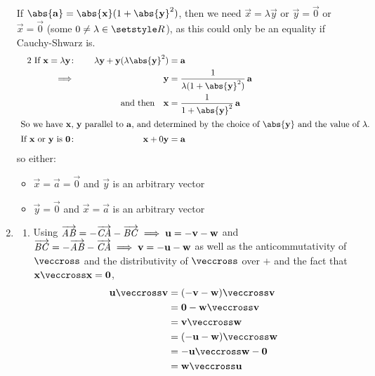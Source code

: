 \documentclass[fleqn,a4paper,11pt]{article}
\begin{document}
\begin{enumerate}
    If \(\abs{\vec a} = \abs{\vec x}(1 + \abs{\vec y}^2)\), then we need
    \(\vec x = \lambda \vec y\) or \(\vec y = \vec 0\) or \(\vec x = \vec 0\)
    (some \(0 \ne \lambda \in \Reals\)), as this
    could only be an equality if Cauchy-Shwarz is.
    \begin{alignat*}2
     \text{
      If \(\vec x = \lambda \vec y\)}\colon
          && \quad \lambda \vec y + \vec y (\lambda \abs{\vec y}^2) &= \vec a \\
     \implies{}&& \vec y &= \frac 1{\lambda(1 + \abs{\vec y}^2)}\,\vec a \\
     && \text{and then} \quad \vec x &=
             \frac 1{1 + \abs{\vec y}^2}\,\vec a \\
     \intertext{
      So we have \(\vec x\), \(\vec y\) parallel to \(\vec a\), and determined
      by the choice of \(\abs{\vec y}\) and the value of \(\lambda\).}
     \text{
      If \(\vec x\) or \(\vec y\) is \(\vec 0\)}\colon
     && \quad \vec x + 0\vec y &= \vec a
    \end{alignat*}
    so either:
    \begin{itemize}
     \item \(\vec x = \vec a = \vec 0\) and \(\vec y\) is an arbitrary vector
     \item \(\vec y = \vec 0\) and \(\vec x = \vec a\) is an arbitrary vector
    \end{itemize}
   \item
    \begin{enumerate}
     \item
      Using
      \(\overrightarrow{\mathit{AB}} = -\overrightarrow{\mathit{CA}} - \overrightarrow{\mathit{BC}} \implies \mathrm{\mathbf{u}} = -\mathrm{\mathbf{v}} - \mathrm{\mathbf{w}}\)
      and
      \(\overrightarrow{\mathit{BC}} = -\overrightarrow{\mathit{AB}} - \overrightarrow{\mathit{CA}} \implies \mathrm{\mathbf{v}} = -\mathrm{\mathbf{u}} - \mathrm{\mathbf{w}}\)
      as well as the anticommutativity of \(\veccross\) and the distributivity
      of \(\veccross\) over \(+\) and the fact that
      \(\vec x \veccross \vec x = \vec 0\),
      \begin{align*}
       \vec u \veccross \vec v &= (-\vec v - \vec w) \veccross \vec v \\
                               &= \vec 0 - \vec w \veccross \vec v \\
                               &= \vec v \veccross \vec w \\
                               &= (-\vec u - \vec w) \veccross \vec w \\
                               &= -\vec u \veccross \vec w - \vec 0 \\
                               &= \vec w \veccross \vec u

\end{align*}
\end{enumerate}
\end{enumerate}
\end{document}
